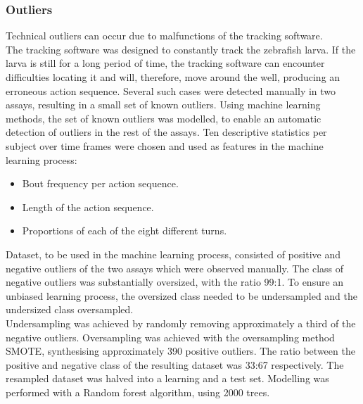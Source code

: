 \documentclass[a4paper,12pt]{article}
\begin{document}
\subsubsection{Outliers}
Technical outliers can occur due to malfunctions of the tracking software. \\The tracking software was designed to constantly track the zebrafish larva. If the larva is still for a long period of time, the tracking software can encounter difficulties locating it and will, therefore, move around the well, producing an erroneous action sequence. Several such cases were detected manually in two assays, resulting in a small set of known outliers.
Using machine learning methods, the set of known outliers was modelled, to enable an automatic detection of outliers in the rest of the assays.
Ten descriptive statistics per subject over time frames were chosen and used as features in the machine learning process:
\begin{itemize}
\item Bout frequency per action sequence.
\item Length of the action sequence.
\item Proportions of each of the eight different turns. 
\end{itemize}
Dataset, to be used in the machine learning process, consisted of positive and negative outliers of the two assays which were observed manually. The class of negative outliers was substantially oversized, with the ratio 99:1. To ensure an unbiased learning process, the oversized class needed to be undersampled and the undersized class oversampled. \\Undersampling was achieved by randomly removing approximately a third of the negative outliers. Oversampling was achieved with the oversampling method SMOTE\cite{ref33}, synthesising approximately 390 positive outliers. The ratio between the positive and negative class of the resulting dataset was 33:67 respectively. The resampled dataset was halved into a learning and a test set.
Modelling was performed with a Random forest algorithm\cite{ref34}, using 2000 trees.
\end{document}
